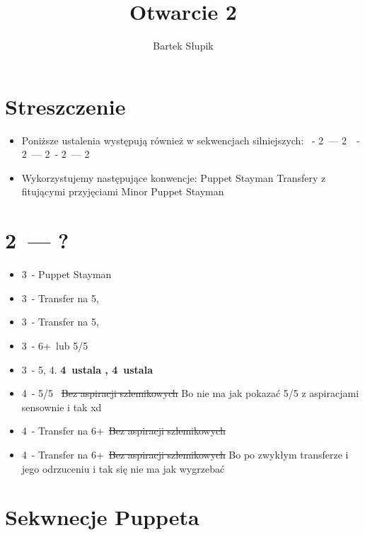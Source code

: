 \documentclass[12pt, a4paper]{article}
\title{Otwarcie 2\ntx}
\author{Bartek Słupik}
\begin{document}
    \section{Streszczenie}
    \begin{itemize}
        \item Poniższe ustalenia występują również w sekwencjach silniejszych:
        \nt
        \clubs\ - 2\diams\ --- 2\nt\
        \clubs\ - 2\diams\ --- 2\hearts\ - 2\spades\ --- 2\nt\
        \item Wykorzystujemy następujące konwencje:
        \subitem Puppet Stayman
        \subitem Transfery z fitującymi przyjęciami
        \subitem Minor Puppet Stayman
    \end{itemize}

    \section{2\ntx\ --- ?}
    \begin{itemize}
        \item 3\clubs\ - Puppet Stayman
        \item 3\diams\ - Transfer na 5\hearts, \gf
        \item 3\hearts\ - Transfer na 5\spades, \gf 
        \item 3\spades\ - 6+\minor\ lub 5/5 \minor
        \item 3\nt\ - 5\spades, 4\hearts. \textbf{4\clubs\ ustala \hearts, 4\diams\ ustala \spades}
        \item 4\clubs\ - 5/5 \major\ \st{Bez aspiracji szlemikowych}
        Bo nie ma jak pokazać 5/5 z aspiracjami sensownie i tak xd
        \item 4\diams\ - Transfer na 6+\hearts\ \st{Bez aspiracji szlemikowych}
        \item 4\hearts\ - Transfer na 6+\spades\ \st{Bez aspiracji szlemikowych}
        Bo po zwykłym transferze i jego odrzuceniu i tak się nie ma jak wygrzebać
    \end{itemize}

    \pagebreak
    \section{Sekwnecje Puppeta}
\end{document}

